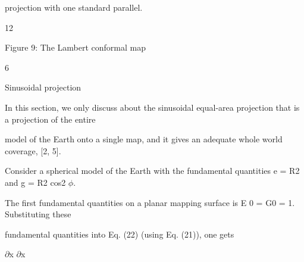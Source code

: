 \documentclass[a4paper,portrait,12pt]{article}
\begin{document}
\begin{flushleft}
projection with one standard parallel.
\end{flushleft}





12





\begin{flushleft}
\newpage
Figure 9: The Lambert conformal map
\end{flushleft}





6





\begin{flushleft}
Sinusoidal projection
\end{flushleft}





\begin{flushleft}
In this section, we only discuss about the sinusoidal equal-area projection that is a projection of the entire
\end{flushleft}


\begin{flushleft}
model of the Earth onto a single map, and it gives an adequate whole world coverage, [2, 5].
\end{flushleft}


\begin{flushleft}
Consider a spherical model of the Earth with the fundamental quantities e = R2 and g = R2 cos2 $\phi$.
\end{flushleft}


\begin{flushleft}
The first fundamental quantities on a planar mapping surface is E 0 = G0 = 1. Substituting these
\end{flushleft}


\begin{flushleft}
fundamental quantities into Eq. (22) (using Eq. (21)), one gets
\end{flushleft}


\newpage





\begin{flushleft}
\newpage
 $\partial$x $\partial$x \newpage

\end{flushleft}
\end{document}
